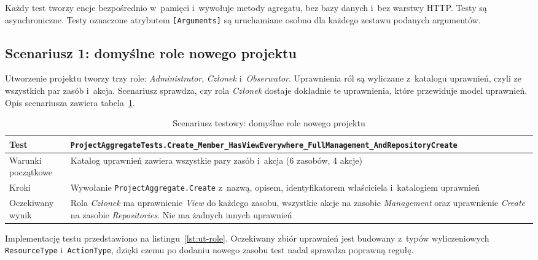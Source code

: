 Każdy test tworzy encje bezpośrednio w~pamięci i~wywołuje metody agregatu, bez bazy danych i~bez warstwy HTTP.
Testy są asynchroniczne. Testy oznaczone atrybutem \texttt{[Arguments]} są uruchamiane osobno dla każdego zestawu
podanych argumentów.

\subsection{Scenariusz 1: domyślne role nowego projektu}
Utworzenie projektu tworzy trzy role: \textit{Administrator}, \textit{Członek} i~\textit{Obserwator}. Uprawnienia ról są
wyliczane z~katalogu uprawnień, czyli ze wszystkich par zasób i~akcja. Scenariusz sprawdza, czy rola \textit{Członek}
dostaje dokładnie te uprawnienia, które przewiduje model uprawnień. Opis scenariusza zawiera tabela~\ref{tab:ut-role}.

\begin{table}[htb]
    \centering
    \caption{Scenariusz testowy: domyślne role nowego projektu}
    \label{tab:ut-role}
    \small
    \begin{tabularx}{\linewidth}{@{}>{\raggedright\arraybackslash}p{3.5cm} >{\raggedright\arraybackslash}X@{}}
        \hline
        Test & \texttt{ProjectAggregateTests.\allowbreak{}Create\_\allowbreak{}Member\_\allowbreak{}HasViewEverywhere\_\allowbreak{}FullManagement\_\allowbreak{}AndRepositoryCreate} \\ \hline
        Warunki początkowe & Katalog uprawnień zawiera wszystkie pary zasób i~akcja (6 zasobów, 4 akcje) \\ \hline
        Kroki & Wywołanie \texttt{ProjectAggregate.Create} z~nazwą, opisem, identyfikatorem właściciela i~katalogiem uprawnień \\ \hline
        Oczekiwany wynik & Rola \textit{Członek} ma uprawnienie \textit{View} do każdego zasobu, wszystkie akcje na zasobie \textit{Management} oraz uprawnienie \textit{Create} na zasobie \textit{Repositories}. Nie ma żadnych innych uprawnień \\ \hline
    \end{tabularx}
\end{table}

Implementację testu przedstawiono na listingu~\ref{lst:ut-role}. Oczekiwany zbiór uprawnień jest budowany z~typów
wyliczeniowych \texttt{ResourceType} i~\texttt{ActionType}, dzięki czemu po dodaniu nowego zasobu test nadal sprawdza
poprawną regułę.

